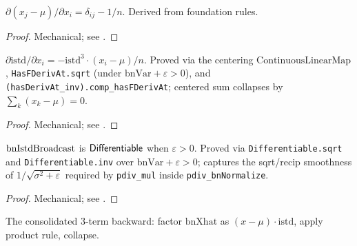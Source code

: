 \begin{theorem}
  \label{ax:pdiv_bnCentered}
  \leanok
  \(\partial (x_j - \mu) / \partial x_i = \delta_{ij} - 1/n\).
  Derived from foundation rules.
\end{theorem}

\begin{proof}
\leanok
Mechanical; see .
\end{proof}

\begin{theorem}
  \label{ax:pdiv_bnIstdBroadcast}
  \leanok
  \(\partial \mathrm{istd}/\partial x_i = -\mathrm{istd}^3 \cdot
  (x_i - \mu)/n\). Proved via the centering \(\mathrm{ContinuousLinearMap}\),
  \texttt{HasFDerivAt.sqrt} (under \(\mathrm{bnVar} + \varepsilon > 0\)),
  and \texttt{(hasDerivAt\_inv).comp\_hasFDerivAt}; centered sum
  collapses by \(\sum_k (x_k - \mu) = 0\).
\end{theorem}

\begin{proof}
\leanok
Mechanical; see .
\end{proof}

\begin{theorem}
  \label{ax:bnIstdBroadcast_diff}
  \leanok
  \(\operatorname{bnIstdBroadcast}\) is \(\mathsf{Differentiable}\) when \(\varepsilon > 0\).
  Proved via \texttt{Differentiable.sqrt} and \texttt{Differentiable.inv}
  over \(\mathrm{bnVar} + \varepsilon > 0\); captures the sqrt/recip
  smoothness of \(1/\sqrt{\sigma^2 + \varepsilon}\) required by
  \texttt{pdiv\_mul} inside \texttt{pdiv\_bnNormalize}.
\end{theorem}

\begin{proof}
\leanok
Mechanical; see .
\end{proof}

\begin{theorem}
  \label{thm:bnNormalize_has_vjp}
  \leanok
  The consolidated 3-term backward: factor \(\mathrm{bnXhat}\) as
  \((x - \mu) \cdot \mathrm{istd}\), apply product rule, collapse.
\end{theorem}

